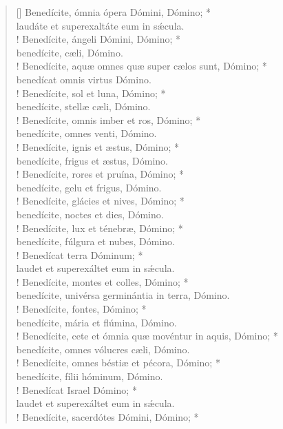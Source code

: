 \begin{verse}[\versewidth]
Benedícite, ómnia ópera Dómini, Dómino; *\\
laudáte et superexaltáte eum in s\'{æ}cula.\\!
\vin Benedícite, ángeli Dómini, Dómino; *\\
\vin benedícite, cæli, Dómino.\\!
Benedícite, aquæ omnes quæ super cælos sunt, Dómino; *\\
benedícat omnis virtus Dómino.\\!
\vin Benedícite, sol et luna, Dómino; *\\
\vin benedícite, stellæ cæli, Dómino.\\!
Benedícite, omnis imber et ros, Dómino; *\\
benedícite, omnes venti, Dómino.\\!
\vin Benedícite, ignis et æstus, Dómino; *\\
\vin benedícite, frigus et æstus, Dómino.\\!
Benedícite, rores et pruína, Dómino; *\\
benedícite, gelu et frigus, Dómino.\\!
\vin Benedícite, glácies et nives, Dómino; *\\
\vin benedícite, noctes et dies, Dómino.\\!
Benedícite, lux et ténebræ, Dómino; *\\
benedícite, fúlgura et nubes, Dómino.\\!
\vin Benedícat terra Dóminum; *\\
\vin laudet et superexáltet eum in s\'{æ}cula.\\!
Benedícite, montes et colles, Dómino; *\\
benedícite, univérsa germinántia in terra, Dómino.\\!
\vin Benedícite, fontes, Dómino; *\\
\vin benedícite, mária et flúmina, Dómino.\\!
Benedícite, cete et ómnia quæ movéntur in aquis, Dómino; *\\
benedícite, omnes vólucres cæli, Dómino.\\!
\vin Benedícite, omnes béstiæ et pécora, Dómino; *\\
\vin benedícite, fílii hóminum, Dómino.\\!
Benedícat Israel Dómino; *\\
laudet et superexáltet eum in s\'{æ}cula.\\!
\vin Benedícite, sacerdótes Dómini, Dómino; *\\

\end{verse}
